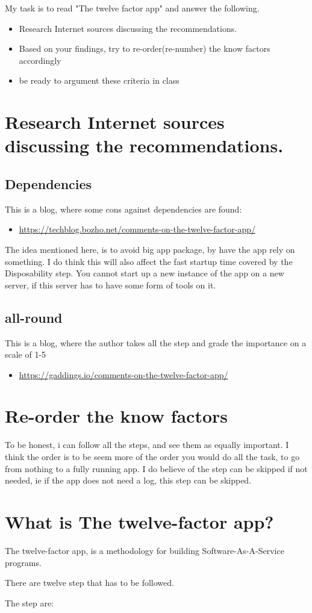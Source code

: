\documentclass{article}
\begin{document}
My task is to read "The twelve factor app" and answer the following.

\begin{itemize}
\item Research Internet sources discussing the recommendations.
\item Based on your findings, try to re-order(re-number) the know factors accordingly
\item be ready to argument these criteria in class
\end{itemize}

\section*{Research Internet sources discussing the recommendations.}

\subsection*{Dependencies}
This is a blog, where some cons against dependencies are found:
\begin{itemize}
\item \url{https://techblog.bozho.net/comments-on-the-twelve-factor-app/}
\end{itemize}
The idea mentioned here, is to avoid big app package, by have the app rely on something. I do think this will also affect the fast startup time covered by the Disposability step.
You cannot start up a new instance of the app on a new server, if this server has to have some form of tools on it.

\subsection*{all-round}
This is a blog, where the author takes all the step and grade the importance on a scale of 1-5
\begin{itemize}
\item \url{https://gaddings.io/comments-on-the-twelve-factor-app/}
\end {itemize}

\section*{Re-order the know factors}
To be honest, i can follow all the steps, and see them as equally important. I think the order is to be seem more of the order you would do all the task, to go from nothing to a fully running app.
I do believe of the step can be skipped if not needed, ie if the app does not need a log, this step can be skipped.

\section*{What is The twelve-factor app?}
The twelve-factor app, is a methodology for building Software-As-A-Service programs.

There are twelve step that has to be followed.


The step are:












\end{document}
